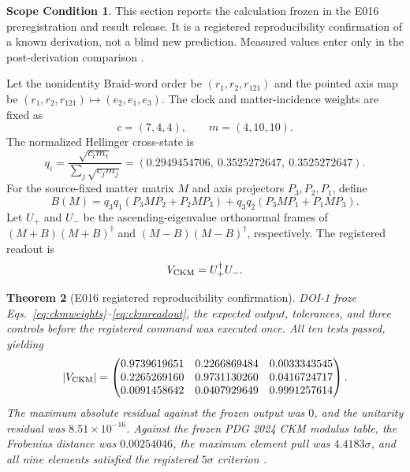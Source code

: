 \documentclass[11pt]{article}
\newtheorem{theorem}{Theorem}[section]
\theoremstyle{definition}
\newtheorem{scope}[theorem]{Scope Condition}
\theoremstyle{remark}
\begin{document}
\begin{scope}
This section reports the calculation frozen in the E016 preregistration and result release. It is a registered reproducibility confirmation of a known derivation, not a blind new prediction. Measured values enter only in the post-derivation comparison \cite{e016prereg,e016result,pdg2024ckm}.
\end{scope}

Let the nonidentity Braid-word order be $(r_1,r_2,r_{121})$ and the pointed axis map be $(r_1,r_2,r_{121})\mapsto(e_2,e_1,e_3)$. The clock and matter-incidence weights are fixed as
\begin{equation}
c=(7,4,4),
\qquad m=(4,10,10).
\label{eq:ckmweights}
\end{equation}
The normalized Hellinger cross-state is
\begin{equation}
q_i=\frac{\sqrt{c_i m_i}}{\sum_j\sqrt{c_jm_j}}
=(0.2949454706,\ 0.3525272647,\ 0.3525272647).
\label{eq:ckmq}
\end{equation}
For the source-fixed matter matrix $M$ and axis projectors $P_3,P_2,P_1$, define
\begin{equation}
B(M)=q_3q_1(P_3MP_2+P_2MP_3)
      +q_3q_2(P_3MP_1+P_1MP_3).
\label{eq:pairstar}
\end{equation}
Let $U_+$ and $U_-$ be the ascending-eigenvalue orthonormal frames of $(M+B)(M+B)^\dagger$ and $(M-B)(M-B)^\dagger$, respectively. The registered readout is
\begin{equation}
V_{\rm CKM}=U_+^\dagger U_-.
\label{eq:ckmreadout}
\end{equation}

\begin{theorem}[E016 registered reproducibility confirmation]
DOI-1 froze Eqs.~\eqref{eq:ckmweights}--\eqref{eq:ckmreadout}, the expected output, tolerances, and three controls before the registered command was executed once. All ten tests passed, yielding
\begin{equation}
|V_{\rm CKM}|=
\begin{pmatrix}
0.9739619651&0.2266869484&0.0033343545\\
0.2265269160&0.9731130260&0.0416724717\\
0.0091458642&0.0407929649&0.9991257614
\end{pmatrix}.
\label{eq:ckmconfirmed}
\end{equation}
The maximum absolute residual against the frozen output was $0$, and the unitarity residual was $8.51\times10^{-16}$. Against the frozen PDG 2024 CKM modulus table, the Frobenius distance was $0.00254046$, the maximum element pull was $4.4183\sigma$, and all nine elements satisfied the registered $5\sigma$ criterion \cite{pdg2024ckm}.
\end{theorem}
\end{document}
